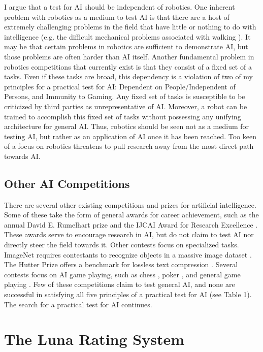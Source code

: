 I argue that a test for AI should be independent of robotics. One inherent problem with robotics as a medium to test AI is that there are a host of extremely challenging problems in the field that have little or nothing to do with intelligence (e.g. the difficult mechanical problems associated with walking \cite{todd13}). It may be that certain problems in robotics are sufficient to demonstrate AI, but those problems are often harder than AI itself. Another fundamental problem in robotics competitions that currently exist is that they consist of a fixed set of a tasks. Even if these tasks are broad, this dependency is a violation of two of my principles for a practical test for AI: Dependent on People/Independent of Persons, and Immunity to Gaming. Any fixed set of tasks is susceptible to be criticized by third parties as unrepresentative of AI. Moreover, a robot can be trained to accomplish this fixed set of tasks without possessing any unifying architecture for general AI. Thus, robotics should be seen not as a medium for testing AI, but rather as an application of AI once it has been reached. Too keen of a focus on robotics threatens to pull research away from the most direct path towards AI. 

\subsection{Other AI Competitions}

There are several other existing competitions and prizes for artificial intelligence. Some of these take the form of general awards for career achievement, such as the annual David E. Rumelhart prize \cite{rumelhart} and the IJCAI Award for Research Excellence \cite{ijcai}. These awards serve to encourage research in AI, but do not claim to test AI nor directly steer the field towards it. Other contests focus on specialized tasks. ImageNet requires contestants to recognize objects in a massive image dataset \cite{russakovsky15}. The Hutter Prize offers a benchmark for lossless text compression \cite{mahoney09}. Several contests focus on AI game playing, such as chess \cite{hayes76}, poker \cite{littman06}, and general game playing \cite{genesereth05}. Few of these competitions claim to test general AI, and none are successful in satisfying all five principles of a practical test for AI (see Table 1). The search for a practical test for AI continues. 

\section{The Luna Rating System}

